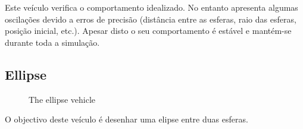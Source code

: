 \documentclass[a4paper]{article}
\begin{document}
\indent Este veículo verifica o comportamento idealizado.
No entanto apresenta algumas oscilações devido a erros de precisão (distância entre as esferas, raio das esferas, posição inicial, etc.).
Apesar disto o seu comportamento é estável e mantém-se durante toda a simulação.

\cleardoublepage
\subsection{Ellipse}
\begin{figure}[h]
	\centering
	
	\caption{The ellipse vehicle}
\end{figure}

\indent O objectivo deste veículo é desenhar uma elipse entre duas esferas.
\end{document}
